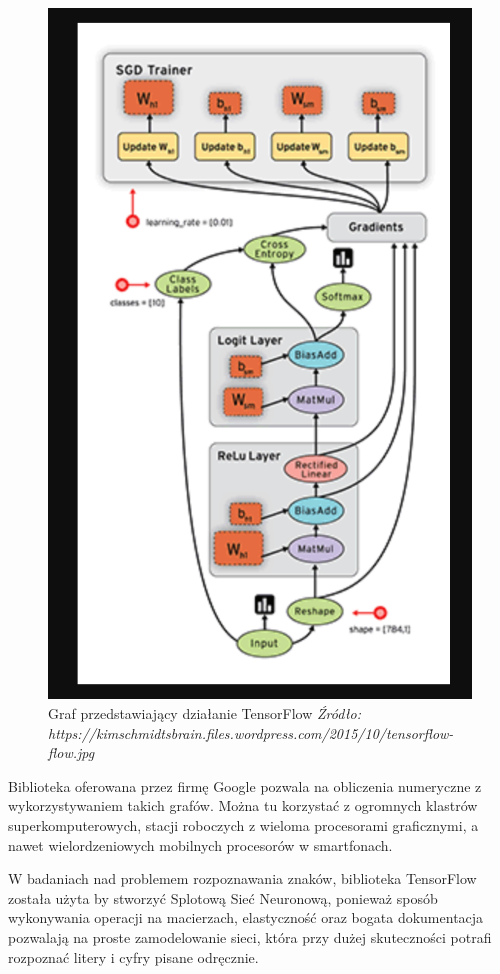\documentclass[brudnopis]{xmgr}
\begin{document}
\begin{figure}[!tbh]
\centering
\includegraphics[width=.8\hsize]{fig/tf}
\caption{Graf przedstawiający działanie TensorFlow \emph{Źródło: https://kimschmidtsbrain.files.wordpress.com/2015/10/tensorflow-flow.jpg}}
\end{figure}
\newpage

Biblioteka oferowana przez firmę Google pozwala na obliczenia numeryczne z wykorzystywaniem takich grafów. Można tu korzystać z ogromnych klastrów superkomputerowych, stacji roboczych z wieloma procesorami graficznymi, a nawet wielordzeniowych mobilnych procesorów w smartfonach.

W badaniach nad problemem rozpoznawania znaków, biblioteka TensorFlow została użyta by stworzyć Splotową  Sieć Neuronową, ponieważ sposób wykonywania operacji na macierzach, elastyczność oraz bogata dokumentacja pozwalają na proste zamodelowanie sieci, która przy dużej skuteczności potrafi rozpoznać litery i cyfry pisane odręcznie.
\end{document}
